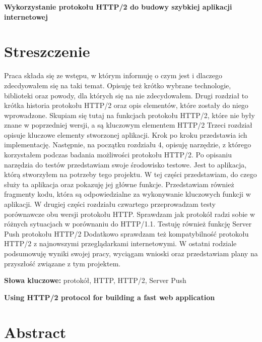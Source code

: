 \newpage
\begin{center}
\large \bf
Wykorzystanie protokołu HTTP/2 do budowy szybkiej aplikacji internetowej
\end{center}

\section*{Streszczenie}
Praca składa się ze wstępu, w którym informuję o czym jest i dlaczego zdecdyowałem się na taki temat.
Opisuję też krótko wybrane technologie, biblioteki oraz powody, dla których się na nie zdecydowałem.
Drugi rozdział to krótka historia protokołu HTTP/2 oraz opis elementów, które zostały do niego wprowadzone.
Skupiam się tutaj na funkcjach protokołu HTTP/2, które nie były znane w poprzedniej wersji, a są kluczowym elementem HTTP/2
Trzeci rozdział opisuje kluczowe elementy stworzonej aplikacji.
Krok po kroku przedstawia ich implementację.
Następnie, na początku rozdziału 4, opisuję narzędzie, z którego korzystałem podczas badania możliwości protokołu HTTP/2.
Po opisaniu narzędzia do testów przedstawiam swoje środowisko testowe.
Jest to aplikacja, którą stworzyłem na potrzeby tego projektu.
W tej części przedstawiam, do czego służy ta aplikacja oraz pokazuję jej główne funkcje.
Przedstawiam również fragmenty kodu, która są odpowiedzialne za wykonywanie kluczowych funkcji w aplikacji.
W drugiej części rozdziału czwartego przeprowadzam testy porównawcze obu wersji protokołu HTTP.
Sprawdzam jak protokół radzi sobie w różnych sytuacjach w porównaniu do HTTP/1.1.
Testuję również funkcję Server Push protokołu HTTP/2
Dodatkowo sprawdzam też kompatybilność protokołu HTTP/2 z najnowszymi przeglądarkami internetowymi.
W ostatni rodziale podsumowuję wyniki swojej pracy, wyciągam wnioski oraz przedstawiam plany na przyszłość związane z tym projektem.

\bigskip
{\noindent\bf Słowa kluczowe:} protokół, HTTP, HTTP/2, Server Push

\vskip 2cm


\begin{center}
\large \bf
Using HTTP/2 protocol for building a fast web application
\end{center}

\section*{Abstract}

